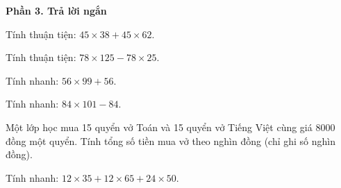 \textbf{Phần 3. Trả lời ngắn}

\begin{ex} %
Tính thuận tiện: $45 \times 38 + 45 \times 62$.
\end{ex}

\begin{ex} %
Tính thuận tiện: $78 \times 125 - 78 \times 25$.
\end{ex}

\begin{ex} %
Tính nhanh: $56 \times 99 + 56$.
\end{ex}

\begin{ex} %
Tính nhanh: $84 \times 101 - 84$.
\end{ex}

\begin{ex} %
Một lớp học mua 15 quyển vở Toán và 15 quyển vở Tiếng Việt cùng giá $8000$ đồng một quyển. Tính tổng số tiền mua vở theo nghìn đồng (chỉ ghi số nghìn đồng).
\end{ex}

\begin{ex} %
Tính nhanh: $12 \times 35 + 12 \times 65 + 24 \times 50$.
\end{ex}
